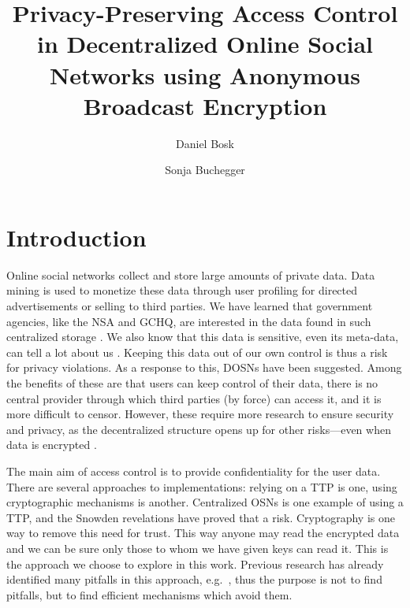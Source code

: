 \title{%
  Privacy-Preserving Access Control in
  Decentralized Online Social Networks using
  Anonymous Broadcast Encryption
}
\author{%
  Daniel Bosk \and
  Sonja Buchegger
}

\maketitle

\acresetall
\section{Introduction}

Online social networks collect and store large amounts of private data.
Data mining is used to monetize these data through user profiling for directed 
advertisements or selling to third parties.
We have learned that government agencies, like the \ac{NSA} and \ac{GCHQ}, are 
interested in the data found in such centralized storage \cite{prism}.
We also know that this data is sensitive, even its meta-data, can tell a lot 
about us \cite[e.g.][]{pregnancy}.
Keeping this data out of our own control is thus a risk for privacy violations.
As a response to this, \acp{DOSN} have been suggested.
Among the benefits of these are that users can keep control of their data, 
there is no central provider through which third parties (by force) can access 
it, and it is more difficult to censor.
However, these require more research to ensure security and privacy, as the 
decentralized structure opens up for other risks---even when data is encrypted 
\cite{metadata}.

The main aim of access control is to provide confidentiality for the user 
data.
There are several approaches to implementations: relying on a \ac{TTP} is one, 
using cryptographic mechanisms is another.
Centralized \acp{OSN} is one example of using a \ac{TTP}, and the Snowden 
revelations \cite{prism} have proved that a risk.
Cryptography is one way to remove this need for trust.
This way anyone may read the encrypted data and we can be sure only those to 
whom we have given keys can read it.
This is the approach we choose to explore in this work.
Previous research has already identified many pitfalls in this approach, 
e.g.~\cite{metadata}, thus the purpose is not to find pitfalls, but to find 
efficient mechanisms which avoid them.


